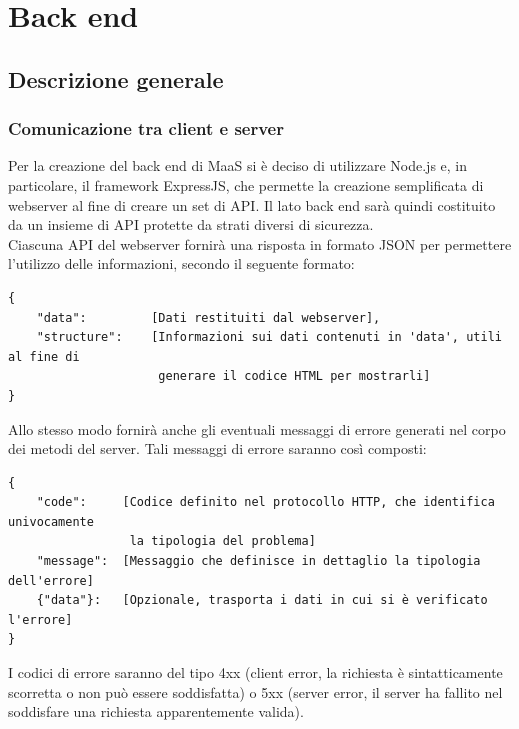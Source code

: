 \section{Back end}
\subsection{Descrizione generale}
\subsubsection{Comunicazione tra client e server}
Per la creazione del back end di MaaS si è deciso di utilizzare Node.js e, in particolare, il framework ExpressJS, che permette la creazione semplificata di webserver al fine di creare un set di API. Il lato back end sarà quindi costituito da un insieme di API protette da strati diversi di sicurezza. \\
Ciascuna API del webserver fornirà una risposta in formato JSON per permettere l'utilizzo delle informazioni, secondo il seguente formato: \\
\begin{verbatim}
{
    "data":         [Dati restituiti dal webserver],
    "structure":    [Informazioni sui dati contenuti in 'data', utili al fine di
                     generare il codice HTML per mostrarli]
}
\end{verbatim}
Allo stesso modo fornirà anche gli eventuali messaggi di errore generati nel corpo dei metodi del server. Tali messaggi di errore saranno così composti: 
\begin{verbatim}
{
    "code":     [Codice definito nel protocollo HTTP, che identifica univocamente
                 la tipologia del problema]
    "message":  [Messaggio che definisce in dettaglio la tipologia dell'errore]
    {"data"}:   [Opzionale, trasporta i dati in cui si è verificato l'errore]
}
\end{verbatim}
I codici di errore saranno del tipo 4xx (client error, la richiesta è sintatticamente scorretta o non può essere soddisfatta) o 5xx (server error, il server ha fallito nel soddisfare una richiesta apparentemente valida).
